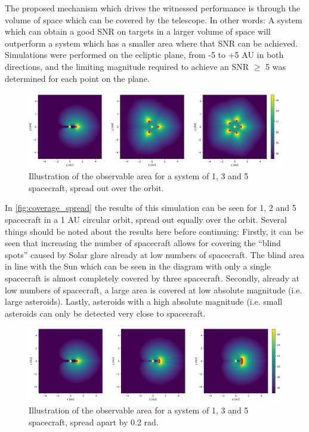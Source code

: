 The proposed mechanism which drives the witnessed performance is through the volume of space which can be covered by the telescope. In other words: A system which can obtain a good SNR on targets in a larger volume of space will outperform a system which has a smaller area where that SNR can be achieved. Simulations were performed on the ecliptic plane, from -5 to +5 AU in both directions, and the limiting magnitude required to achieve an SNR $\geq$ 5 was determined for each point on the plane. \\

\begin{figure}[htbp]
 \centering
 \includegraphics[width=1.0\textwidth]{img/coverage_spread.png}
 \caption{Illustration of the observable area for a system of 1, 3 and 5 spacecraft, spread out over the orbit.}
 \label{fig:coverage_spread}
\end{figure}

In \autoref{fig:coverage_spread} the results of this simulation can be seen for 1, 2 and 5 spacecraft in a 1 AU circular orbit, spread out equally over the orbit. Several things should be noted about the results here before continuing: Firstly, it can be seen that increasing the number of spacecraft allows for covering the ``blind spots'' caused by Solar glare already at low numbers of spacecraft. The blind area in line with the Sun which can be seen in the diagram with only a single spacecraft is almost completely covered by three spacecraft. Secondly, already at low numbers of spacecraft, a large area is covered at low absolute magnitude (i.e. large asteroids).  Lastly, asteroids with a high absolute magnitude (i.e. small asteroids can only be detected very close to spacecraft. \\

\begin{figure}[htbp]
 \centering
 \includegraphics[width=1.0\textwidth]{img/coverage_tight.png}
 \caption{Illustration of the observable area for a system of 1, 3 and 5 spacecraft, spread apart by 0.2 rad.}
 \label{fig:coverage_tight}
\end{figure}


